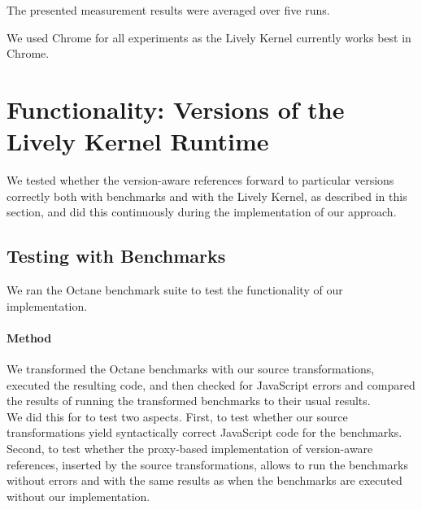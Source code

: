 The presented measurement results were averaged over five runs.

We used Chrome for all experiments as the Lively Kernel currently works best in Chrome.







\section{Functionality: Versions of the Lively Kernel Runtime} \label{sec:DISCUSSION:1}

We tested whether the version-aware references forward to particular versions correctly both with benchmarks and with the Lively Kernel, as described in this section, and did this continuously during the implementation of our approach.

\subsection{Testing with Benchmarks}

We ran the Octane benchmark suite to test the functionality of our implementation.

\paragraph{Method}
We transformed the Octane benchmarks with our source transformations, executed the resulting code, and then checked for JavaScript errors and compared the results of running the transformed benchmarks to their usual results.\\
We did this for to test two aspects.
First, to test whether our source transformations yield syntactically correct JavaScript code for the benchmarks.
Second, to test whether the proxy-based implementation of version-aware references, inserted by the source transformations, allows to run the benchmarks without errors and with the same results as when the benchmarks are executed without our implementation.


